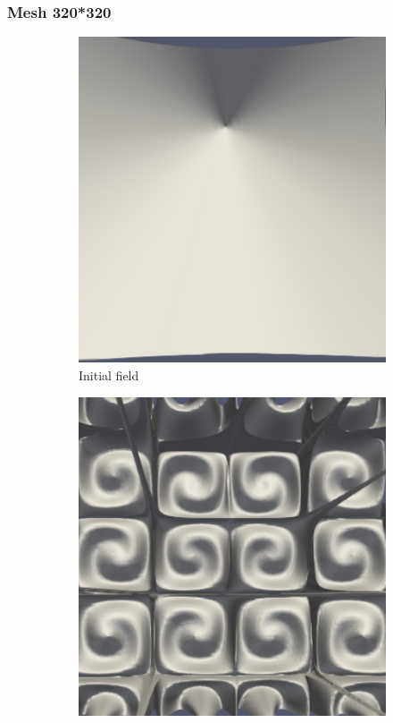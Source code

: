 \documentclass{article}
\begin{document}
\subsubsection{Mesh 320*320}
\begin{figure}[hbt!]
  \begin{subfigure}{0.4\textwidth}
        \centering
        \includegraphics[width=\textwidth]{Figures/5e-5 320x320/for n 1.png}
        \caption{Initial field}
  \end{subfigure}
  \hfill
  \begin{subfigure}{0.4\textwidth}
        \centering
        \includegraphics[width=\textwidth]{Figures/5e-5 320x320/for n 20.png}

\end{subfigure}
\end{figure}
\end{document}
